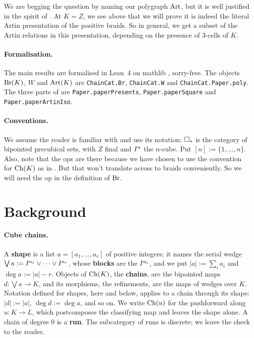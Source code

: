 \documentclass[11pt]{article}
\begin{document}
We are begging the question by naming our polygraph $\operatorname{Art}$, but it is well justified in the spirit of \cite{GGM}. 
At $K = Z$, we see above that we will prove it is indeed the literal Artin presentation of the positive braids.
So in general, we get a subset of the Artin relations in this presentation, depending on the presence of 3-cells of $K$.

\paragraph{Formalisation.}
The main results are formalised in Lean~4 on mathlib \cite{Cubical}, sorry-free. The objects
$\operatorname{Br}(K)$, $W$ and $\operatorname{Art}(K)$ are \texttt{ChainCat.Br}, \texttt{ChainCat.W} and
\texttt{ChainCat.Paper.poly}. The three parts of  are \texttt{Paper.paperPresents},
\texttt{Paper.paperSquare} and \texttt{Paper.paperArtinIso}.


\paragraph{Conventions.}
We assume the reader is familiar with \cite{PZ,Z2} and use its notation: $\square_{*}$ is the category of bipointed
precubical sets, with $Z$ final and $I^{n}$ the $n$-cube. Put $[n] := \{1,\dots,n\}$.
Also, note that the ops are there because we have chosen to use the convention for $\operatorname{Ch}(K)$ as in \cite{Z2}.
But that won't translate across to braids conveniently. So we will need the op in the definition of $\operatorname{Br}$.

\section{Background}\label{sec:background}

\paragraph{Cube chains.}
A \textbf{shape} is a list $a = [a_1,\dots,a_r]$ of positive integers; it names the serial wedge
$\bigvee a := I^{a_1} \vee \cdots \vee I^{a_r}$, whose \textbf{blocks} are the $I^{a_i}$,
and we put $|a| := \sum_i a_i$ and $\deg a := |a| - r$. Objects of $\operatorname{Ch}(K)$, the \textbf{chains},
are the bipointed maps $d : \bigvee a \to K$, and its morphisms, the refinements, are the maps of
wedges over $K$. Notation defined for shapes, here and below, applies to a chain through its shape:
$|d| := |a|$, $\deg d := \deg a$, and so on. We write $\operatorname{Ch}(u)$ for the pushforward
along $u : K \to L$, which postcomposes the classifying map and leaves the shape alone. A chain of
degree $0$ is a \textbf{run}. The subcategory of runs is discrete; we leave the check to the
reader.
\end{document}
